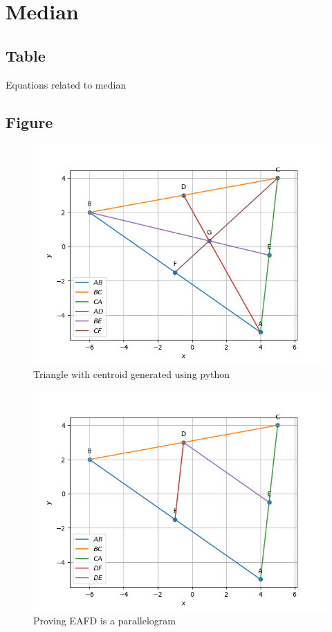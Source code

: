 \documentclass[journal,12pt,onecolumn]{IEEEtran}
\theoremstyle{remark}
\begin{document}
\section{Median}
\subsection{Table}
\begin{table}[!htb]
	
	\caption{Equations related to median}
	\label{tab58:equations_median}	
\end{table}
\FloatBarrier
\subsection{Figure}
\begin{figure}[!htb]
	\centering
	\includegraphics[width=\columnwidth]{figs/2.png}
	\caption{Triangle with centroid generated using python}
	\label{fig58:Triangle_with_centroid}	
\end{figure}
\begin{figure}[!htb]
	\centering
	\includegraphics[width=\columnwidth]{figs/2_7.png}
	\caption{Proving EAFD is a parallelogram}
	\label{fig58:Triangle_with_altitude}	
\end{figure}
\FloatBarrier
\end{document}
